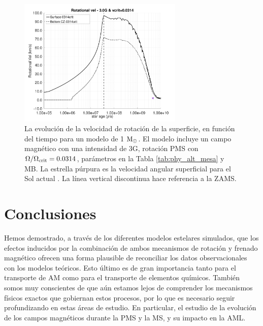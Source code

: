 \begin{figure}
    \centering
    \includegraphics[width=0.7\textwidth]{img/paper1/rot_vel_3_0g_0314vc.pdf}
	\caption{La evolución de la velocidad de rotación de la superficie, en función del tiempo para un modelo de 1 $\mathrm{M}_\odot$. El modelo incluye un campo magnético con una intensidad de 3G, rotación PMS con $\Omega / \Omega_{\mathrm{crit}}=0.0314$, parámetros en la Tabla \ref{tab:phy_alt_mesa} y MB. La estrella púrpura es la velocidad angular superficial para el Sol actual \cite{Gill2012}. La línea vertical discontinua hace referencia a la ZAMS.}
	\label{fig:rot_vel_var_vel_mlt_3_0g}
\end{figure}

\section{Conclusiones} \label{sec_conclusions_i}
Hemos demostrado, a través de los diferentes modelos estelares simulados, que los efectos inducidos por la combinación de ambos mecanismos de rotación y frenado magnético ofrecen una forma plausible de reconciliar los datos observacionales con los modelos teóricos. Esto último es de gran importancia tanto para el transporte de AM como para el transporte de elementos químicos. También somos muy conscientes de que aún estamos lejos de comprender los mecanismos físicos exactos que gobiernan estos procesos, por lo que es necesario seguir profundizando en estas áreas de estudio. En particular, el estudio de la evolución de los campos magnéticos durante la PMS y la MS, y su impacto en la AML. \par

